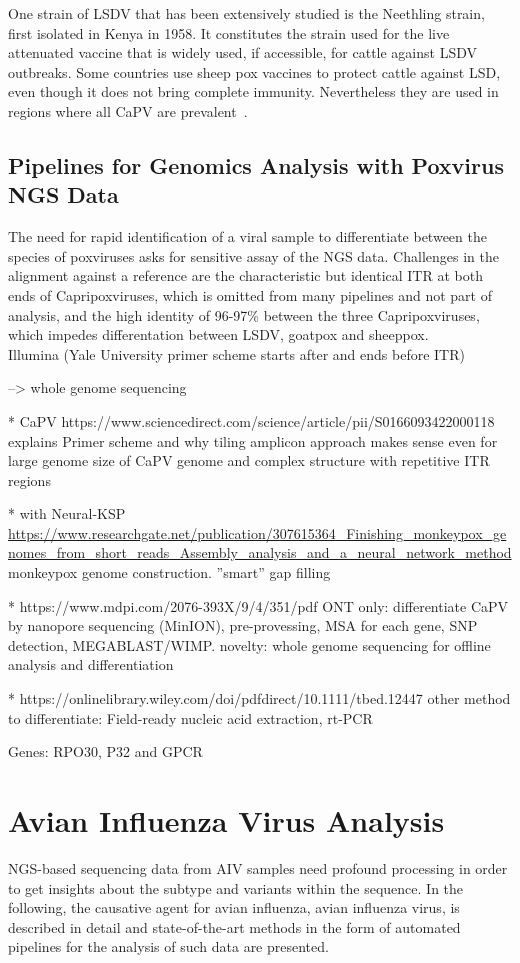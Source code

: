 One strain of LSDV that has been extensively studied is the Neethling strain, first isolated in Kenya in 1958. It constitutes the strain used for the live attenuated vaccine that is widely used, if accessible, for cattle against LSDV outbreaks. Some countries use sheep pox vaccines to protect cattle against LSD, even though it does not bring complete immunity. Nevertheless they are used in regions where all CaPV are prevalent~\cite{brenner2009appearance}.

\subsection{Pipelines for Genomics Analysis with Poxvirus NGS Data}
The need for rapid identification of a viral sample to differentiate between the species of poxviruses asks for sensitive assay of the NGS data. Challenges in the alignment against a reference are the characteristic but identical ITR at both ends of Capripoxviruses, which is omitted from many pipelines and not part of analysis, and the high identity of 96-97\% between the three Capripoxviruses, which impedes differentation between LSDV, goatpox and sheeppox. \\
Illumina (Yale University primer scheme starts after and ends before ITR)

--> whole genome sequencing

* CaPV https://www.sciencedirect.com/science/article/pii/S0166093422000118 explains Primer scheme and why tiling amplicon approach makes sense even for large genome size of CaPV genome and complex structure with repetitive ITR regions

* with Neural-KSP \url{https://www.researchgate.net/publication/307615364_Finishing_monkeypox_genomes_from_short_reads_Assembly_analysis_and_a_neural_network_method}
monkeypox genome construction. ''smart'' gap filling

* https://www.mdpi.com/2076-393X/9/4/351/pdf ONT only: differentiate CaPV by nanopore sequencing (MinION), pre-provessing, MSA for each gene, SNP detection, MEGABLAST/WIMP. novelty: whole genome sequencing for offline analysis and differentiation

* https://onlinelibrary.wiley.com/doi/pdfdirect/10.1111/tbed.12447 other method to differentiate: Field-ready nucleic acid extraction, rt-PCR

Genes: RPO30, P32 and GPCR

\section{Avian Influenza Virus Analysis}\label{sec:AIV}
NGS-based sequencing data from AIV samples need profound processing in order to get insights about the subtype and variants within the sequence. In the following, the causative agent for avian influenza, avian influenza virus, is described in detail and state-of-the-art methods in the form of automated pipelines for the analysis of such data are presented.

